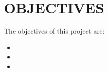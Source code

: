 \chapter{OBJECTIVES}
	\label{chap:obj}
	
	The objectives of this project are:
	\begin{itemize}
		\item 
		\item 
		\item
	\end{itemize}